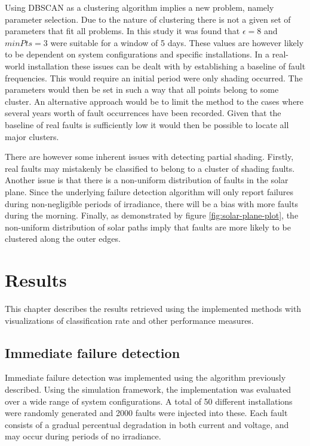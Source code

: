 Using DBSCAN as a clustering algorithm implies a new problem, namely parameter selection.
Due to the nature of clustering there is not a given set of parameters that fit all problems.
In this study it was found that $\epsilon = 8$ and $minPts = 3$ were suitable for a window of 5 days.
These values are however likely to be dependent on system configurations and specific installations.
In a real-world installation these issues can be dealt with by establishing a baseline of fault frequencies.
This would require an initial period were only shading occurred.
The parameters would then be set in such a way that all points belong to some cluster.
An alternative approach would be to limit the method to the cases where several years worth of fault occurrences have been recorded.
Given that the baseline of real faults is sufficiently low it would then be possible to locate all major clusters.

There are however some inherent issues with detecting partial shading.
Firstly, real faults may mistakenly be classified to belong to a cluster of shading faults.
Another issue is that there is a non-uniform distribution of faults in the solar plane.
Since the underlying failure detection algorithm will only report failures during non-negligible periods
of irradiance, there will be a bias with more faults during the morning.
Finally, as demonstrated by figure \ref{fig:solar-plane-plot}, the non-uniform distribution of solar paths imply that 
faults are more likely to be clustered along the outer edges.

\chapter{Results}
This chapter describes the results retrieved using the implemented methods with visualizations of classification rate and other performance measures.

\section{Immediate failure detection}
Immediate failure detection was implemented using the algorithm previously described.
Using the simulation framework, the implementation was evaluated over a wide range of system configurations.
A total of 50 different installations were randomly generated and 2000 faults were injected into these.
Each fault consists of a gradual percentual degradation in both current and voltage, and may occur during periods of no irradiance.

